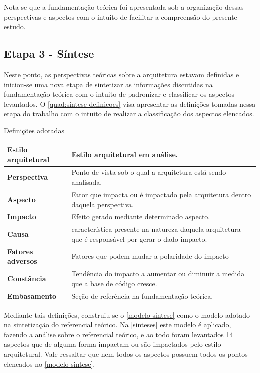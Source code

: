 Nota-se que a fundamentação teórica foi apresentada sob a organização dessas perspectivas e aspectos
com o intuito de facilitar a compreensão do presente estudo.

\subsection{Etapa 3 - Síntese}
\label{met:sintese}

Neste ponto, as perspectivas teóricas sobre a arquitetura estavam definidas e iniciou-se uma nova
etapa de sintetizar as informações discutidas na fundamentação teórica com o intuito de padronizar e
classificar os aspectos levantados. O \autoref{quad:sintese-definicoes} visa apresentar as
definições tomadas nessa etapa do trabalho com o intuito de realizar a classificação dos aspectos
elencados.

\begin{quadro}
    \caption{Definições adotadas\label{quad:sintese-definicoes}}
    \begin{tabularx}{\linewidth}{ | p{5cm} | X | }
    \hline
    \textbf{Estilo arquitetural} & Estilo arquitetural em análise. \\ \hline
    \textbf{Perspectiva}         & Ponto de vista sob o qual a arquitetura está sendo analisada. \\ \hline
    \textbf{Aspecto}             & Fator que impacta ou é impactado pela arquitetura dentro daquela perspectiva. \\ \hline
    \textbf{Impacto}             & Efeito gerado mediante determinado aspecto. \\ \hline
    \textbf{Causa}               & característica presente na natureza daquela arquitetura que é responsável por gerar o dado impacto. \\ \hline
    \textbf{Fatores adversos}    & Fatores que podem mudar a polaridade do impacto \\ \hline
    \textbf{Constância}          & Tendência do impacto a aumentar ou diminuir a medida que a base de código cresce. \\ \hline
    \textbf{Embasamento}         & Seção de referência na fundamentação teórica. \\ \hline
    \end{tabularx}
\end{quadro}

Mediante tais definições, construiu-se o \autoref{modelo-sintese} como o modelo adotado na
sintetização do referencial teórico. Na \autoref{sinteses} este modelo é aplicado, fazendo a
análise sobre o referencial teórico, e ao todo foram levantados 14 aspectos que de alguma forma
impactam ou são impactados pelo estilo arquitetural. Vale ressaltar que nem todos os aspectos
possuem todos os pontos elencados no \autoref{modelo-sintese}.

